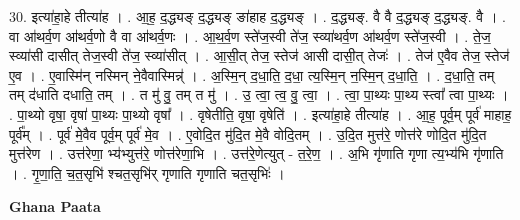 \documentclass[17pt]{extarticle}
\begin{document}
30. इत्या॑हा॒हे तीत्या॑ह । . आ॒ह॒ द॒द्ध्यङ् द॒द्ध्यङ् ङा॑हाह द॒द्ध्यङ् । . द॒द्ध्यङ्. वै वै द॒द्ध्यङ् द॒द्ध्यङ्. वै । . वा आ॑थर्व॒ण आ॑थर्व॒णो वै वा आ॑थर्व॒णः । . आ॒थ॒र्व॒ण स्ते॑ज॒स्वी ते॑ज॒ स्व्या॑थर्व॒ण आ॑थर्व॒ण स्ते॑ज॒स्वी । . ते॒ज॒ स्व्या॑सी दासीत् तेज॒स्वी ते॑ज॒ स्व्या॑सीत् । . आ॒सी॒त् तेज॒ स्तेज॑ आसी दासी॒त् तेजः॑ । . तेज॑ ए॒वैव तेज॒ स्तेज॑ ए॒व । . ए॒वास्मि॑न् नस्मिन् ने॒वैवास्मिन्न्॑ । . अ॒स्मि॒न् द॒धा॒ति॒ द॒धा॒ त्य॒स्मि॒न् न॒स्मि॒न् द॒धा॒ति॒ । . द॒धा॒ति॒ तम् तम् द॑धाति दधाति॒ तम् । . त मु॑ वु॒ तम् त मु॑ । . उ॒ त्वा॒ त्व॒ वु॒ त्वा॒ । . त्वा॒ पा॒थ्यः पा॒थ्य स्त्वा᳚ त्वा पा॒थ्यः । . पा॒थ्यो वृषा॒ वृषा॑ पा॒थ्यः पा॒थ्यो वृषा᳚ । . वृषेतीति॒ वृषा॒ वृषेति॑ । . इत्या॑हा॒हे तीत्या॑ह । . आ॒ह॒ पूर्व॒म् पूर्व॑ माहाह॒ पूर्व᳚म् । . पूर्व॑ मे॒वैव पूर्व॒म् पूर्व॑ मे॒व । . ए॒वोदि॒त मु॑दि॒त मे॒वै वोदि॒तम् । . उ॒दि॒त मुत्त॑रे॒ णोत्त॑रे णोदि॒त मु॑दि॒त मुत्त॑रेण । . उत्त॑रेणा॒ भ्य॑भ्युत्त॑रे॒ णोत्त॑रेणा॒भि । . उत्त॑रे॒णेत्युत् - त॒रे॒ण॒ । . अ॒भि गृ॑णाति गृणा त्य॒भ्य॑भि गृ॑णाति । . गृ॒णा॒ति॒ च॒त॒सृभि॑ श्चत॒सृभि॑र् गृणाति गृणाति चत॒सृभिः॑ । \newline

\textbf{Ghana Paata } \newline
\end{document}
